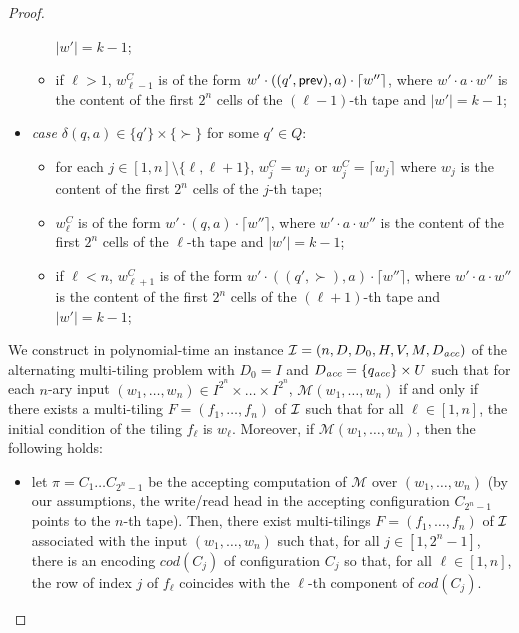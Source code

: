 \begin{proof}
\begin{itemize}
\begin{itemize}
$|w'|= k-1$;
\item if $\ell>1$, $w_{\ell-1}^{C}$ is of the form $w'\cdot ((q',\text{{\sffamily prev}}),a) \cdot \lceil w''\rceil$, where $w'\cdot a \cdot w''$ is the content of the first $2^{n}$ cells of the $(\ell-1)$-th tape and $|w'|= k-1$;
\end{itemize}
\item \emph{case  $\delta(q,a)\in \{q'\}\times\{\succ\}$} for some $q'\in Q$:
\begin{itemize}
\item for each $j\in [1,n]\setminus \{\ell,\ell+1\}$,
     $w_j^{C}=w_j$ or $w_j^{C}=\lceil w_j \rceil$ where $w_j$ is the content of the first $2^{n}$ cells of the $j$-th tape;
\item $w_\ell^{C}$ is of the form $w' \cdot (q, a) \cdot \lceil w''\rceil$, where $w'\cdot a \cdot w''$ is the content of the first $2^{n}$ cells of the $\ell$-th tape and
$|w'|= k-1$;
\item if $\ell<n$, $w_{\ell+1}^{C}$ is of the form $ w' \cdot ((q',\succ),a) \cdot \lceil w''\rceil$, where $w'\cdot a \cdot w''$ is the content of the first $2^{n}$ cells of the $(\ell+1)$-th tape and $|w'|= k-1$;
\end{itemize}
\end{itemize}



We construct in polynomial-time an instance $\mathcal{I}= (n,D,D_0,H,V, M,D_{\textit{acc}})$ of the alternating multi-tiling problem with $D_0=I$ and $D_{\textit{acc}} = \{q_{\textit{acc}}\}\times U$
such that for each $n$-ary input $(w_1,\ldots,w_n)\in I^{2^{n}}\times \ldots \times I^{2^{n}}$,
$\mathcal{M}(w_1,\ldots,w_n)$ if and only if there exists a multi-tiling $F=(f_1,\ldots,f_n)$
 of $\mathcal{I}$ such that for all $\ell\in [1,n]$, the initial condition of the tiling $f_\ell$ is $w_\ell$. Moreover, if
$\mathcal{M}(w_1,\ldots,w_n)$, then the following holds:
\begin{itemize}
\item let $\pi = C_1 \ldots C_{2^{n}-1}$ be the accepting computation of $\mathcal{M}$ over $(w_1,\ldots,w_n)$ (by our assumptions, the
 write/read head in the accepting configuration $C_{2^{n}-1}$ points to the $n$-th tape).
 Then, there exist    multi-tilings
$F=(f_1,\ldots,f_n)$ of $\mathcal{I}$ associated with the input $(w_1,\ldots,w_n)$ such that, for all $j\in [1, 2^{n}-1]$, there is an encoding $\textit{cod}(C_j)$ 
of configuration $C_j$ so that, 
 for all $\ell\in [1,n]$, the
row of index $j$ of $f_\ell$ coincides with the $\ell$-th component of $\textit{cod}(C_j)$.
\end{itemize}


\end{proof}
